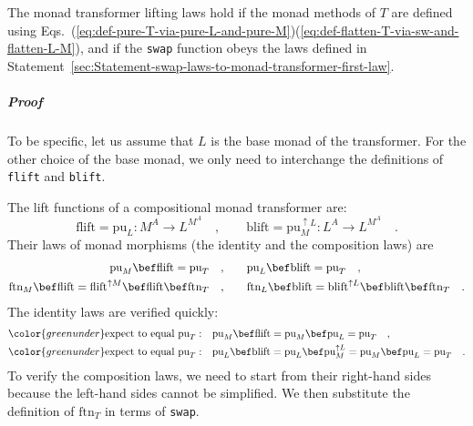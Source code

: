 The monad transformer lifting laws hold if the monad methods of $T$
are defined using Eqs.~(\ref{eq:def-pure-T-via-pure-L-and-pure-M})\textendash (\ref{eq:def-flatten-T-via-sw-and-flatten-L-M}),
and if the \lstinline!swap! function obeys the laws defined in Statement~\ref{sec:Statement-swap-laws-to-monad-transformer-first-law}.

\subparagraph{Proof}

To be specific, let us assume that $L$ is the base monad of the transformer.
For the other choice of the base monad, we only need to interchange
the definitions of \lstinline!flift! and \lstinline!blift!.

The lift functions of a compositional monad transformer are:
\[
\text{flift}=\text{pu}_{L}:M^{A}\rightarrow L^{M^{A}}\quad,\quad\quad\text{blift}=\text{pu}_{M}^{\uparrow L}:L^{A}\rightarrow L^{M^{A}}\quad.
\]
Their laws of monad morphisms (the identity and the composition laws)
are 
\begin{align*}
\text{pu}_{M}\bef\text{flift}=\text{pu}_{T}\quad,\quad & \quad\text{pu}_{L}\bef\text{blift}=\text{pu}_{T}\quad,\\
\text{ftn}_{M}\bef\text{flift}=\text{flift}^{\uparrow M}\bef\text{flift}\bef\text{ftn}_{T}\quad,\quad & \quad\text{ftn}_{L}\bef\text{blift}=\text{blift}^{\uparrow L}\bef\text{blift}\bef\text{ftn}_{T}\quad.
\end{align*}
The identity laws are verified quickly:
\begin{align*}
{\color{greenunder}\text{expect to equal }\text{pu}_{T}:}\quad & \text{pu}_{M}\bef\text{flift}=\text{pu}_{M}\bef\text{pu}_{L}=\text{pu}_{T}\quad,\\
{\color{greenunder}\text{expect to equal }\text{pu}_{T}:}\quad & \text{pu}_{L}\bef\text{blift}=\text{pu}_{L}\bef\text{pu}_{M}^{\uparrow L}=\text{pu}_{M}\bef\text{pu}_{L}=\text{pu}_{T}\quad.
\end{align*}
To verify the composition laws, we need to start from their right-hand
sides because the left-hand sides cannot be simplified. We then substitute
the definition of $\text{ftn}_{T}$ in terms of \lstinline!swap!.

